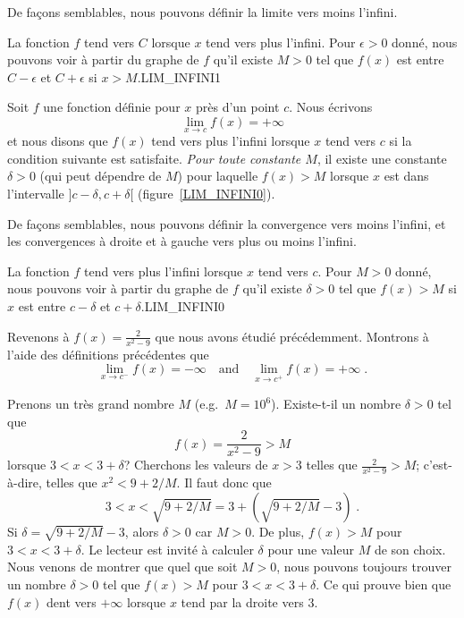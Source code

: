 {\begin{defn}
De façons semblables, nous pouvons définir la limite vers moins l'infini.
\label{epM_def_of_lim_at_inf}
\end{defn}

{La fonction $f$ tend vers $C$ lorsque $x$ tend vers plus l'infini.
Pour $\epsilon>0$ donné, nous pouvons voir à partir du graphe de $f$ qu'il
existe $M>0$ tel que $f(x)$ est entre $C-\epsilon$ et $C+\epsilon$ si
$x>M$.}{LIM_INFINI1}

\begin{defn} 
Soit $f$ une fonction définie pour $x$ près d'un point $c$.  Nous écrivons
\[
\lim_{x\rightarrow c} f(x) = +\infty
\]
et nous disons que $f(x)$ tend vers plus l'infini lorsque $x$ tend vers $c$
si la condition suivante est satisfaite.
{\em Pour toute constante $M$}, il existe une constante $\delta>0$
(qui peut dépendre de $M$) pour laquelle $f(x) > M$ lorsque $x$ est
dans l'intervalle $]c-\delta,c+\delta[$ (figure~\ref{LIM_INFINI0}).

De façons semblables, nous pouvons définir la convergence vers moins
l'infini, et les convergences à droite et à gauche vers plus ou moins
l'infini.
\end{defn}

{La fonction $f$ tend vers plus l'infini lorsque $x$ tend vers
$c$.  Pour $M>0$ donné, nous pouvons voir à partir du graphe de $f$ qu'il
existe $\delta>0$ tel que $f(x)>M$ si $x$ est entre $c-\delta$ et
$c+\delta$.}{LIM_INFINI0}

\begin{egg}
Revenons à $\displaystyle f(x) = \frac{2}{x^2-9}$ que nous avons étudié
précédemment.  Montrons à l'aide des définitions précédentes que 
\[
\lim_{x\rightarrow c^-} f(x) = -\infty \quad \text{and} \quad
\lim_{x\rightarrow c^+} f(x) = +\infty \; .
\]

Prenons un très grand nombre $M$ (e.g.\ $M=10^6$).  Existe-t-il un
nombre $\delta>0$ tel que
\[
f(x)=\frac{2}{x^2-9} > M
\]
lorsque $3<x<3+\delta$?  Cherchons les valeurs de $x>3$ telles que
$\displaystyle \frac{2}{x^2-9} > M$; c'est-à-dire, telles que
$x^2 < 9 + 2/M$.  Il faut donc que
\[
3<x < \sqrt{9+2/M} = 3 + \left(\sqrt{9+2/M} - 3\right) \; .
\]
Si $\delta = \sqrt{9+2/M} - 3$, alors $\delta > 0$ car
$M>0$.  De plus, $f(x)>M$ pour $3<x<3+\delta$.  Le lecteur est invité à
calculer $\delta$ pour une valeur $M$ de son choix.  Nous venons de
montrer que quel que soit $M>0$, nous pouvons toujours trouver un nombre
$\delta>0$ tel que $f(x)>M$ pour $3<x<3+\delta$.  Ce qui prouve bien
que $f(x)$ dent vers $+\infty$ lorsque $x$ tend par la droite vers
$3$.


\end{egg}}
